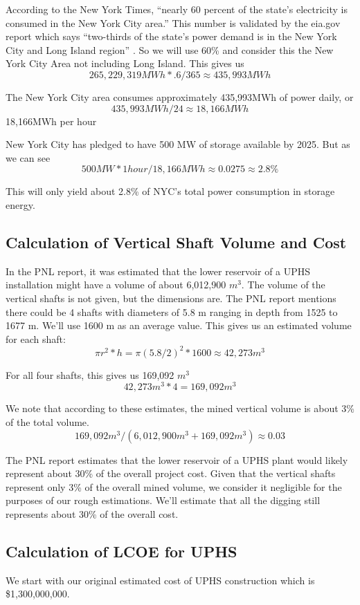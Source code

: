 According to the New York Times, “nearly 60 percent of the state’s electricity is consumed in the New York City area.” \cite{HowNewYorkCityGetsItsElectricity} This number is validated by the eia.gov report which says “two-thirds of the state's power demand is in the New York City and Long Island region” \cite{NewYorkStateEnergyProfile}. So we will use 60\% and consider this the New York City Area not including Long Island. This gives us
\[ 265,229,319MWh * .6  / 365 \approx 435,993MWh \]

The New York City area consumes approximately 435,993MWh of power daily, or
\[ 435,993MWh / 24 \approx 18,166MWh \]
18,166MWh per hour

New York City has pledged to have 500 MW of storage available by 2025. But as we can see
\[ 500MW * 1 hour / 18,166MWh \approx 0.0275 \approx 2.8\% \]

This will only yield about 2.8\% of NYC's total power consumption in storage energy.


\subsection{Calculation of Vertical Shaft Volume and Cost}
In the PNL report, it was estimated that the lower reservoir of a UPHS installation might have a volume of about 6,012,900 $m^3$. The volume of the vertical shafts is not given, but the dimensions are. The PNL report mentions there could be 4 shafts with diameters of 5.8 m ranging in depth from 1525 to 1677 m. \cite{UndergroundPumpedHydroelectricStorage} We'll use 1600 m as an average value. This gives us an estimated volume for each shaft:
\[ \pi r^2 * h = \pi (5.8 / 2)^2 * 1600 \approx 42,273 m^3\]

For all four shafts, this gives us 169,092 $m^3$
\[ 42,273 m^3 * 4 = 169,092 m^3\]

We note that according to these estimates, the mined vertical volume is about 3\% of the total volume.
\[ 169,092 m^3 / (6,012,900 m^3 + 169,092 m^3) \approx 0.03 \]

The PNL report estimates that the lower reservoir of a UPHS plant would likely represent about 30\% of the overall project cost. \cite{UndergroundPumpedHydroelectricStorage} Given that the vertical shafts represent only 3\% of the overall mined volume, we consider it negligible for the purposes of our rough estimations. We'll estimate that all the digging still represents about 30\% of the overall cost.


\subsection{Calculation of LCOE for UPHS}
We start with our original estimated cost of UPHS construction which is \$1,300,000,000.

